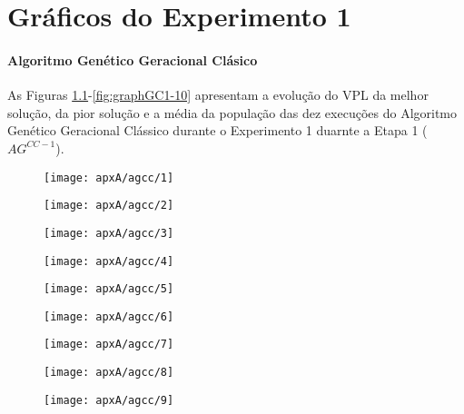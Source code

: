 \chapter{Gráficos do Experimento 1}

\subsubsection{Algoritmo Genético Geracional Clásico}
As Figuras \ref{fig:graphGC1-01}-\ref{fig:graphGC1-10} apresentam a evolução do VPL da melhor solução, da pior solução e a média da população das dez execuções do Algoritmo Genético Geracional Clássico durante o Experimento 1 duarnte a Etapa 1 ($AG^{CC-1}$).

\begin{figure}[H]
\centering
\label{fig:graphGC1-01}
\texttt{[image: apxA/agcc/1]}
\end{figure}

\begin{figure}[H]
\centering
\texttt{[image: apxA/agcc/2]}
\end{figure}

\begin{figure}[H]
\centering
\texttt{[image: apxA/agcc/3]}
\end{figure}

\begin{figure}[H]
\centering

\texttt{[image: apxA/agcc/4]}
\end{figure}
\begin{figure}[htb]
\centering
\texttt{[image: apxA/agcc/5]}
\end{figure}


\begin{figure}[H]
\centering

\texttt{[image: apxA/agcc/6]}
\end{figure}

\begin{figure}[H]
\centering

\texttt{[image: apxA/agcc/7]}
\end{figure}

\begin{figure}[H]
\centering

\texttt{[image: apxA/agcc/8]}
\end{figure}

\begin{figure}[H]
\centering

\texttt{[image: apxA/agcc/9]}
\end{figure}

